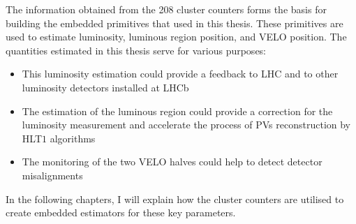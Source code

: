 The information obtained from the 208 cluster counters forms the basis for building the embedded primitives that used in this thesis. These primitives are used to estimate luminosity, luminous region position, and VELO position. The quantities estimated in this thesis serve for various purposes:
\begin{itemize}
    \item This luminosity estimation could provide a feedback to LHC and to other luminosity detectors installed at LHCb
    \item The estimation of the luminous region could provide a correction for the luminosity measurement and  accelerate the process of PVs reconstruction by HLT$1$ algorithms
    \item The monitoring of the two VELO halves could help to detect detector misalignments
\end{itemize}

In the following chapters, I will explain how the cluster counters are utilised to create embedded estimators for these key parameters. 
